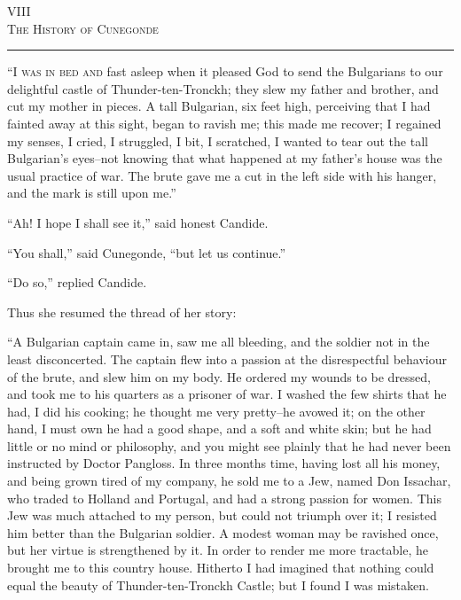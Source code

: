\begin{center}
VIII\\
\textsc{The History of Cunegonde}
\end{center}
\vspace{-0.5cm}
\rule{\textwidth}{0.5pt}
\lettrine{``I}{ was in bed and} fast asleep when it pleased God to send the Bulgarians to our delightful castle of Thunder-ten-Tronckh; they slew my father and brother, and cut my mother in pieces. A tall Bulgarian, six feet high, perceiving that I had fainted away at this sight, began to ravish me; this made me recover; I regained my senses, I cried, I struggled, I bit, I scratched, I wanted to tear out the tall Bulgarian's eyes--not knowing that what happened at my father's house was the usual practice of war. The brute gave me a cut in the left side with his hanger, and the mark is still upon me.''

``Ah! I hope I shall see it,'' said honest Candide.

``You shall,'' said Cunegonde, ``but let us continue.''

``Do so,'' replied Candide.

Thus she resumed the thread of her story:

``A Bulgarian captain came in, saw me all bleeding, and the soldier not in the least disconcerted. The captain flew into a passion at the disrespectful behaviour of the brute, and slew him on my body. He ordered my wounds to be dressed, and took me to his quarters as a prisoner of war. I washed the few shirts that he had, I did his cooking; he thought me very pretty--he avowed it; on the other hand, I must own he had a good shape, and a soft and white skin; but he had little or no mind or philosophy, and you might see plainly that he had never been instructed by Doctor Pangloss. In three months time, having lost all his money, and being grown tired of my company, he sold me to a Jew, named Don Issachar, who traded to Holland and Portugal, and had a strong passion for women. This Jew was much attached to my person, but could not triumph over it; I resisted him better than the Bulgarian soldier. A modest woman may be ravished once, but her virtue is strengthened by it. In order to render me more tractable, he brought me to this country house. Hitherto I had imagined that nothing could equal the beauty of Thunder-ten-Tronckh Castle; but I found I was mistaken.

